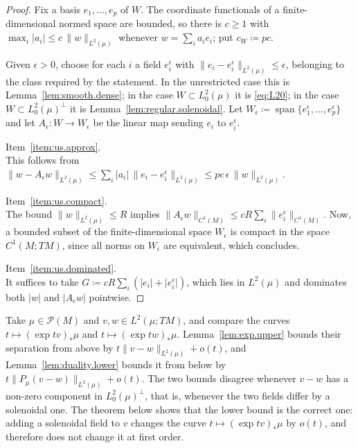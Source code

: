 \documentclass[11pt,reqno]{amsart}
\theoremstyle{plain}
\theoremstyle{definition}
\newcommand{\Prob}{\mathcal{P}}
\begin{document}
\begin{proof}
    Fix a basis \( e_1,\dots,e_p \) of \( W \).
    The coordinate functionals of a finite-dimensional normed space are bounded, so there is \( c\ge1 \) with \( \max_i\lvert a_i\rvert\le c\,\lVert w\rVert_{L^2(\mu)} \) whenever \( w=\sum_ia_ie_i \); put \( c_W\coloneqq pc \).

    Given \( \epsilon>0 \), choose for each \( i \) a field \( e_i^\epsilon \) with \( \lVert e_i-e_i^\epsilon\rVert_{L^2(\mu)}\le\epsilon \), belonging to the class required by the statement.
    In the unrestricted case this is Lemma~\ref{lem:smooth.dense}; in the case \( W\subset L^2_0(\mu) \) it is \eqref{eq:L20}; in the case \( W\subset L^2_0(\mu)^\perp \) it is Lemma~\ref{lem:regular.solenoidal}.
    Let \( W_\epsilon\coloneqq\operatorname{span}\{e_1^\epsilon,\dots,e_p^\epsilon\} \) and let \( A_\epsilon:W\to W_\epsilon \) be the linear map sending \( e_i \) to \( e_i^\epsilon \).
    
    \medskip
    \noindent Item~\ref{item:us.approx}.\\
    This follows from \( \lVert w-A_\epsilon w\rVert_{L^2(\mu)}\le\sum_i\lvert a_i\rvert\,\lVert e_i-e_i^\epsilon\rVert_{L^2(\mu)}\le pc\,\epsilon\,\lVert w\rVert_{L^2(\mu)} \).

    \medskip
    \noindent Item~\ref{item:us.compact}.\\ 
    The bound \( \lVert w\rVert_{L^2(\mu)}\le R \) implies \( \lVert A_\epsilon w\rVert_{C^1(M)}\le cR\sum_i\lVert e_i^\epsilon\rVert_{C^1(M)} \). 
    Now, a bounded subset of the finite-dimensional space \( W_\epsilon \) is compact in the space \( C^1(M;TM) \), since all norms on \( W_\epsilon \) are equivalent, which concludes.

    \medskip
    \noindent Item~\ref{item:us.dominated}.\\
    It suffices to take \( G\coloneqq cR\sum_i\left(\lvert e_i\rvert+\lvert e_i^\epsilon\rvert\right) \), which lies in \( L^2(\mu) \) and dominates both \( \lvert w\rvert \) and \( \lvert A_\epsilon w\rvert \) pointwise.
\end{proof}



Take \( \mu\in\Prob(M) \) and \( v,w\in L^2(\mu;TM) \), and compare the curves \( t\mapsto(\exp tv)_\ast\mu \) and \( t\mapsto(\exp tw)_\ast\mu \).
Lemma~\ref{lem:exp.upper} bounds their separation from above by \( t\lVert v-w\rVert_{L^2(\mu)}+o(t) \), and Lemma~\ref{lem:duality.lower} bounds it from below by \( t\lVert P_\mu(v-w)\rVert_{L^2(\mu)}+o(t) \).
The two bounds disagree whenever \( v-w \) has a non-zero component in \( L^2_0(\mu)^\perp \), that is, whenever the two fields differ by a solenoidal one.
The theorem below shows that the lower bound is the correct one: adding a solenoidal field to \( v \) changes the curve \( t\mapsto(\exp tv)_\ast\mu \) by \( o(t) \), and therefore does not change it at first order.
\end{document}

